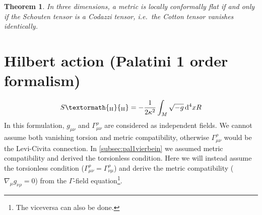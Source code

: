 \documentclass[a4paper,12pt]{book}
\newcommand{\ped}[1]{\textormath{\textsubscript{#1}}{_{\mathrm{#1}}}}
\newcommand{\ap}[1]{\textormath{\textsuperscript{#1}}{^{\mathrm{#1}}}}
\newcommand{\dd}{\mathop{\mathrm{d}\!}{}}
\newtheorem{theorem}{Theorem}
\theoremstyle{definition}
\theoremstyle{remark}
\begin{document}
\begin{theorem}
In three dimensions, a metric is locally conformally flat if and only if the Schouten tensor is a Codazzi tensor, i.e.~the Cotton tensor vanishes identically.
\end{theorem}

\section{Hilbert action (Palatini 1\ap{st} order formalism)}
\[S\ped{H}=-\frac1{2\kappa^2}\int_M\sqrt{-g}\dd^4xR\]
In this formulation, $g_{\mu\nu}$ and $\Gamma^\rho_{\mu\nu}$ are considered as independent fields. We cannot assume both vanishing torsion and metric compatibility, otherwise $\Gamma^\rho_{\mu\nu}$ would be the Levi-Civita connection. In \cref{subsec:pal1vierbein} we assumed metric compatibility and derived the torsionless condition. Here we will instead assume the torsionless condition ($\Gamma^\rho_{\mu\nu}=\Gamma^\rho_{\nu\mu}$) and derive the metric compatibility ($\nabla_\mu g_{\nu\rho}=0$) from the $\Gamma$-field equation\footnote{The viceversa can also be done.}.
\end{document}
